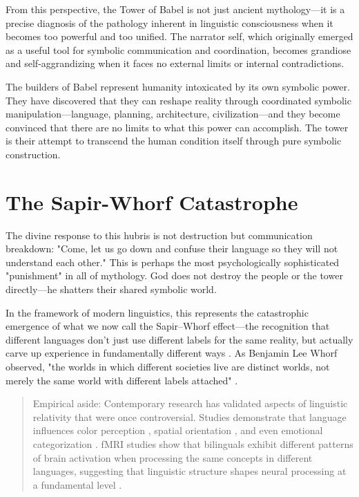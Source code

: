 From this perspective, the Tower of Babel is not just ancient mythology—it is a precise diagnosis of the pathology inherent in linguistic consciousness when it becomes too powerful and too unified. The narrator self, which originally emerged as a useful tool for symbolic communication and coordination, becomes grandiose and self-aggrandizing when it faces no external limits or internal contradictions.

The builders of Babel represent humanity intoxicated by its own symbolic power. They have discovered that they can reshape reality through coordinated symbolic manipulation—language, planning, architecture, civilization—and they become convinced that there are no limits to what this power can accomplish. The tower is their attempt to transcend the human condition itself through pure symbolic construction.

\section{The Sapir-Whorf Catastrophe}

The divine response to this hubris is not destruction but communication breakdown: "Come, let us go down and confuse their language so they will not understand each other." This is perhaps the most psychologically sophisticated "punishment" in all of mythology. God does not destroy the people or the tower directly—he shatters their shared symbolic world.

In the framework of modern linguistics, this represents the catastrophic emergence of what we now call the Sapir–Whorf effect—the recognition that different languages don't just use different labels for the same reality, but actually carve up experience in fundamentally different ways \parencite{sapir1929status,whorf1956language}. As Benjamin Lee Whorf observed, "the worlds in which different societies live are distinct worlds, not merely the same world with different labels attached" \parencite{whorf1956language}.

\begin{quote}\small
Empirical aside: Contemporary research has validated aspects of linguistic relativity that were once controversial. Studies demonstrate that language influences color perception \parencite{winawer2007russian}, spatial orientation \parencite{levinson2003space}, and even emotional categorization \parencite{lindquist2015language}. fMRI studies show that bilinguals exhibit different patterns of brain activation when processing the same concepts in different languages, suggesting that linguistic structure shapes neural processing at a fundamental level \parencite{abutalebi2008neural}.
\end{quote}

